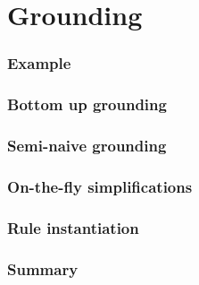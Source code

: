 \part{Grounding}


\section{Example}

\section{Bottom up grounding}

\section{Semi-naive grounding}

\section{On-the-fly simplifications}

\section{Rule instantiation}

\section{Summary}

%
